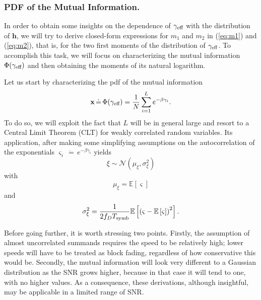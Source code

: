 \documentclass[journal,onecolumn,10pt,a4paper]{IEEEtran}
\def\h{{\mathbf h}}
\def\x{{\mathbf x}}
\def\gammaeff{{\gamma_\textnormal{eff} }}
\newcommand{\ex}{\mathbb{E}}
\begin{document}
\subsubsection{PDF of the Mutual Information.}
\label{subsec:mi}
In order to obtain some insights on the dependence of $\gamma_{\textnormal{eff}}$ with the distribution of $\h$, we will try to derive closed-form expressions for $m_1$ and $m_2$ in (\ref{eq:m1}) and (\ref{eq:m2}), that is, for the two first moments of the distribution of $\gammaeff$. To accomplish this task, we will focus on characterizing the mutual information $\Phi(\gammaeff)$ and then obtaining the moments of its natural logarithm.

Let us start by characterizing the pdf of the mutual information 
\begin{equation}
 \x\,\dot=\,\Phi(\gammaeff) = \frac{1}{N}\sum_{i=1}^Le^{-\beta\gamma_i}.
\end{equation}
To do so, we will exploit the fact that $L$ will be in general large and resort to a Central Limit Theorem (CLT) for weakly correlated random variables\cite{billingsley95}. Its application, after making some simplifying assumptions on the autocorrelation of the exponentials $\varsigma_i\,\dot=\,e^{-\beta\gamma_i}$ yields
\begin{equation}
 \xi\sim\mathcal{N}(\mu_\xi,\sigma_\xi^2)
\end{equation}
with
\begin{equation}\label{eq:mean_xi}
 \mu_\xi = \ex[\varsigma]
\end{equation}
and 
\begin{equation}\label{eq:var_xi}
 \sigma_\xi^2 = \frac{1}{2f_DT_{\textnormal{symb}}}\ex\left[\left(\varsigma-\ex\left[\varsigma\right]\right)^2\right].
\end{equation}


Before going further, it is worth stressing two points. Firstly, the assumption of almost uncorrelated summands requires the speed to be relatively high; lower speeds will have to be treated as block fading, regardless of how conservative this would be. Secondly, the mutual information will look very different to a Gaussian distribution as the SNR grows higher, because in that case it will tend to one, with no higher values. As a consequence, these derivations, although insightful, may be applicable in a limited range of SNR.
\end{document}
